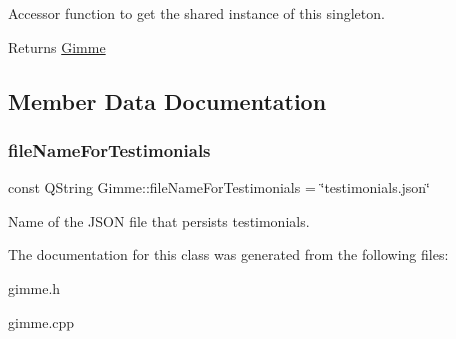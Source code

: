 Accessor function to get the shared instance of this singleton. 

\begin{DoxyReturn}{Returns}
\mbox{\hyperlink{class_gimme}{Gimme}} 
\end{DoxyReturn}


\subsection{Member Data Documentation}
\mbox{\label{class_gimme_aa9fd95a9aa3dc9734d4f8357c4620efa}} 
\subsubsection{\texorpdfstring{fileNameForTestimonials}{fileNameForTestimonials}}
{\footnotesize\ttfamily const Q\+String Gimme\+::file\+Name\+For\+Testimonials = \char`\"{}testimonials.\+json\char`\"{}}

Name of the J\+S\+ON file that persists testimonials. 

The documentation for this class was generated from the following files\+:\begin{DoxyCompactItemize}
\item 
gimme.\+h\item 
gimme.\+cpp\end{DoxyCompactItemize}
